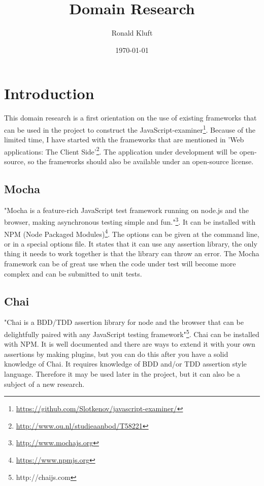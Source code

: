 \documentclass{article}
\begin{document}
\title{Domain Research}
\author{Ronald Kluft}
\date{\today}
\maketitle


\section{Introduction}
This domain research is a first orientation on the use of existing frameworks that can be used in the 
project to construct the JavaScript-examiner\footnote{\url{https://github.com/Slotkenov/javascript-examiner/}}.
Because of the limited time, I have started with the frameworks that are mentioned in 
'Web applications: The Client Side'\footnote{\url{http://www.ou.nl/studieaanbod/T58221}}.
The application under development will be open-source, so the frameworks should also be available
under an open-source license.

\subsection{Mocha}
"Mocha is a feature-rich JavaScript test framework running on node.js and the 
browser, making asynchronous testing simple and fun."\footnote{\url{http://www.mochajs.org}}.
It can be installed with NPM (Node Packaged Modules)\footnote{\url{https://www.npmjs.org}}.
The options can be given at the command line, or in a special options file.
It states that it can use any assertion library, the only thing it needs to work together is that the library can throw an error.
The Mocha framework can be of great use when the code under test will become more complex and can be submitted to unit tests.

\subsection{Chai}
"Chai is a BDD/TDD assertion library for node and the browser that can be delightfully paired with any JavaScript testing framework"\footnote{http://chaijs.com}.
Chai can be installed with NPM.
It is well documented and there are ways to extend it with your own assertions by making plugins,
but you can do this after you have a solid knowledge of Chai.
It requires knowledge of BDD and/or TDD assertion style language.
Therefore it may be used later in the project, but it can also be a subject of a new research.
\end{document}
